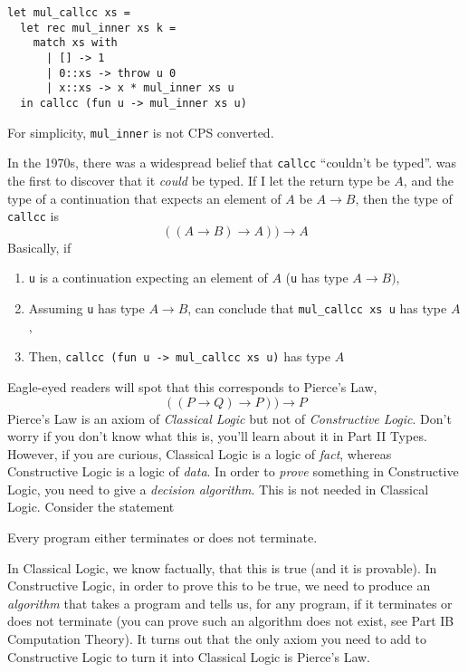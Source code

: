 \begin{code}
\label{code:mul-ocaml-callcc}
\begin{verbatim}
let mul_callcc xs = 
  let rec mul_inner xs k = 
    match xs with
      | [] -> 1
      | 0::xs -> throw u 0
      | x::xs -> x * mul_inner xs u
  in callcc (fun u -> mul_inner xs u)
\end{verbatim}
\end{code}

For simplicity, \texttt{mul\_inner} is not CPS converted. 

In the 1970s, there was a widespread belief that \texttt{callcc} ``couldn't be typed''. \citet{griffin-1990} was the first to discover that it \emph{could} be typed. If I let the return type be $A$, and the type of a continuation that expects an element of $A$ be $A \rightarrow B$, then the type of \texttt{callcc} is
\[((A \rightarrow B) \rightarrow A)) \rightarrow A\]
Basically, if
\begin{enumerate}
    \item \texttt{u} is a continuation expecting an element of $A$ (\texttt{u} has type $A \rightarrow B)$,
    \item Assuming \texttt{u} has type $A \rightarrow B$, can conclude that \texttt{mul\_callcc xs u} has type $A$,
    \item Then, \texttt{callcc (fun u -> mul\_callcc xs u)} has type $A$
\end{enumerate} 

Eagle-eyed readers will spot that this corresponds to Pierce's Law, 
\[((P \rightarrow Q) \rightarrow P)) \rightarrow P\]
Pierce's Law is an axiom of \emph{Classical Logic} but not of \emph{Constructive Logic}. Don't worry if you don't know what this is, you'll learn about it in {\sffamily Part II Types}. However, if you are curious, Classical Logic is a logic of \emph{fact}, whereas Constructive Logic is a logic of \emph{data}. In order to \emph{prove} something in Constructive Logic, you need to give a \emph{decision algorithm}. This is not needed in Classical Logic. Consider the statement 

\begin{center}
    Every program either terminates or does not terminate.
\end{center}

In Classical Logic, we know factually, that this is true (and it is provable). In Constructive Logic, in order to prove this to be true, we need to produce an \emph{algorithm} that takes a program and tells us, for any program, if it terminates or does not terminate (you can prove such an algorithm does not exist, see {\sffamily Part IB Computation Theory}). It turns out that the only axiom you need to add to Constructive Logic to turn it into Classical Logic is Pierce's Law. 


